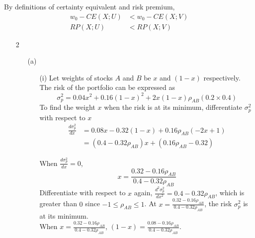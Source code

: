 \documentclass{article}
\begin{document}
\begin{enumerate}
\begin{itemize}
\begin{itemize}
By definitions of certainty equivalent and risk premium, 
\begin{align*}
w_0-CE(X;U)&<w_0-CE(X;V) \\
RP(X;U)&<RP(X;V) 
\end{align*}

\end{itemize}
\end{itemize}
\end{enumerate}

\begin{enumerate}
\item[2]
\begin{itemize}
\item[(a)]
\begin{itemize}
\item[(i)]
Let weights of stocks $A$ and $B$ be $x$ and $(1-x)$ respectively. The risk of the portfolio can be expressed as
\[\sigma_p^2 = 0.04x^2+0.16(1-x)^2+2x(1-x)\rho_{AB}(0.2\times 0.4)\]
To find the weight $x$ when the risk is at its minimum, differentiate $\sigma_p^2$ with respect to $x$
\begin{align*}
\frac{d\sigma_p^2}{dx} &=0.08x-0.32(1-x)+0.16\rho_{AB}(-2x+1) \\
&=(0.4-0.32\rho_{AB})x+(0.16\rho_{AB}-0.32)
\end{align*}

When $\displaystyle\frac{d\sigma_p^2}{dx}=0$, 
\[x=\frac{0.32-0.16\rho_{AB}}{0.4-0.32\rho_{AB}}\]
\newline
Differentiate with respect to $x$ again, $\frac{d^2\sigma_p^2}{dx^2}=0.4-0.32\rho_{AB}$, which is greater than $0$ since $-1\leq\rho_{AB}\leq1$. At $x=\displaystyle\frac{0.32-0.16\rho_{AB}}{0.4-0.32\rho_{AB}}$, the risk $\sigma_p^2$ is at its minimum.
\\
When $x=\displaystyle\frac{0.32-0.16\rho_{AB}}{0.4-0.32\rho_{AB}}$, $(1-x)=\displaystyle\frac{0.08-0.16\rho_{AB}}{0.4-0.32\rho_{AB}}$. \\


\end{itemize}
\end{itemize}
\end{enumerate}
\end{document}
